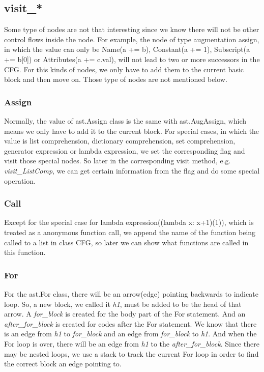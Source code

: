 \documentclass[11pt]{article}
\begin{document}
\subsection{visit\_*}
Some type of nodes are not that interesting since we know there will not be other control flows inside the node. For example, the node of type augmentation assign, in which the value can only be Name(a += b), Constant(a += 1), Subscript(a += b[0]) or Attributes(a += c.val), will not lead to two or more successors in the CFG. For this kinds of nodes, we only have to add them to the current basic block and then move on. Those type of nodes are not mentioned below.

\subsubsection{Assign}
Normally, the value of ast.Assign class is the same with ast.AugAssign, which means we only have to add it to the current block. For special cases, in which the value is list comprehension, dictionary comprehension, set comprehension, generator expression or lambda expression, we set the corresponding flag and visit those special nodes. So later in the corresponding visit method, e.g. \textit{visit\_ListComp}, we can get certain information from the flag and do some special operation.

\subsubsection{Call}
Except for the special case for lambda expression((lambda x: x+1)(1)), which is treated as a anonymous function call, we append the name of the function being called to a list in class CFG, so later we can show what functions are called in this function.

\subsubsection{For}
For the ast.For class, there will be an arrow(edge) pointing backwards to indicate loop. So, a new block, we called it \textit{h1}, must be added to be the head of that arrow. A \textit{for\_block} is created for the body part of the For statement. And an \textit{after\_for\_block} is created for codes after the For statement. We know that there is an edge from \textit{h1} to \textit{for\_block} and an edge from \textit{for\_block} to \textit{h1}. And when the For loop is over, there will be an edge from \textit{h1} to the \textit{after\_for\_block}. Since there may be nested loops, we use a stack to track the current For loop in order to find the correct block an edge pointing to.
\end{document}

